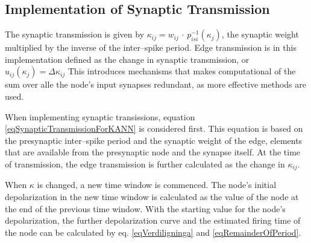 



			\subsection{Implementation of Synaptic Transmission}
			\label{ssecImpOfSynTransmissionKANNN}
	
	
			The synaptic transmission is given by $\kappa_{ij} = w_{ij} \, \cdot \, p_{isi}^{-1}(\kappa_j)$, the synaptic weight multiplied by the inverse of the inter--spike period.
			Edge transmission is in this implementation defined as the change in synaptic transmission, or $u_{ij}(\kappa_j) = \Delta \kappa_{ij}$
			This introduces mechanisms that makes computational of the sum over alle the node's input synapses redundant, as more effective methods are used. %
	
			When implementing synaptic transissions, equation \eqref{eqSynapticTransmissionForKANN} is considered first.
			This equation is based on the presynaptic inter--spike period and the synaptic weight of the edge, elements that are available from the presynaptic node and the synapse itself.
			At the time of transmission, the edge transmission is further calculated as the change in $\kappa_{ij}$.
			
			When $\kappa$ is changed, a new time window is commenced. 
			The node's initial depolarization in the new time window is calculated as the value of the node at the end of the previous time window.
			With the starting value for the node's depolarization, the further depolarization curve and the estimated firing time of the node can be calculated by eq. \eqref{eqVerdiligninga} and \eqref{eqRemainderOfPeriod}.

